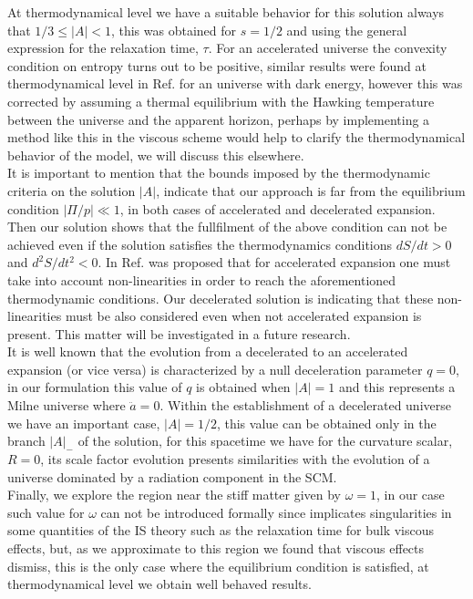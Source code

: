 \documentclass[twocolumn,showpacs,nofootinbib,floats,amsmath,amssymb]{revtex4}
\begin{document}
At thermodynamical level we have a suitable behavior for this solution always that $1/3 \leq \left|A\right| < 1$, this was obtained for $s=1/2$ and using the general expression for the relaxation time, $\tau$. For an accelerated universe the convexity condition on entropy turns out to be positive, similar results were found at thermodynamical level in Ref. \cite{gong} for an universe with dark energy, however this was corrected by assuming a thermal equilibrium with the Hawking temperature between the universe and the apparent horizon, perhaps by implementing a method like this in the viscous scheme would help to clarify the thermodynamical behavior of the model, we will discuss this elsewhere.\\ 
It is important to mention that the bounds imposed by the thermodynamic criteria on the solution $\left|A\right|$, indicate that our approach is far from the equilibrium condition $\left|\Pi/p\right| \ll 1$, in both cases of accelerated and decelerated expansion. Then our solution shows that the fullfilment of the above condition can not be achieved even if the solution satisfies the thermodynamics conditions $dS/dt > 0$ and $d^{2}S/dt^{2} < 0$. In Ref. \cite{maartens} was proposed that for accelerated expansion one must take into account non-linearities in order to reach the aforementioned thermodynamic conditions. Our decelerated solution is indicating that these non-linearities must be also considered even when not accelerated expansion is present. This matter will be investigated in a future research.\\ 

It is well known that the evolution from a decelerated to an accelerated expansion (or vice versa) is characterized by a null deceleration parameter $q = 0$, in our formulation this value of $q$ is obtained when $\left|A\right| = 1$ and this represents a Milne universe where $\ddot{a} = 0$. Within the establishment of a decelerated universe we have an important case, $\left|A\right| = 1/2$, this value can be obtained only in the branch $\left|A\right|_{-}$ of the solution, for this spacetime we have for the curvature scalar, $R=0$, its scale factor evolution presents similarities with the evolution of a universe dominated by a radiation component in the SCM.\\ 

Finally, we explore the region near the stiff matter given by $\omega = 1$, in our case such value for $\omega$ can not be introduced formally since implicates singularities in some quantities of the IS theory such as the relaxation time for bulk viscous effects, but, as we approximate to this region we found that viscous effects dismiss, this is the only case where the equilibrium condition is satisfied, at thermodynamical level we obtain well behaved results.\\
\end{document}
